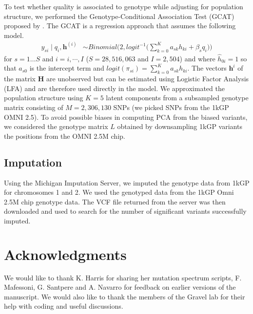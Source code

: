 \documentclass[9pt,article]{template}
\begin{document}
To test whether quality is associated to genotype while adjusting for population structure, we performed the Genotype-Conditional Association Test  (GCAT) proposed by \citep{song2015testing}.
The GCAT is a regression approach that assumes the following model.
\begin{align}\label{gcat}
 y_{si} \mid q_i, \boldsymbol{h}^{(i)} &\sim Binomial\bigg( 2, logit^{-1}\Big( \sum_{k=0}^{K} a_{sk} h_{ki} + \beta_s q_i\Big) \bigg)
\end{align} 
for $s=1\hdots S$ and $i=i,\cdots, I$  ($S = 28,516,063$ and $I = 2,504$) and where $\hat{h}_{0i}=1$ so that $a_{s0}$ is the intercept term and $logit(\pi_{si})=\sum_{k=0}^{K} a_{sk} h_{ki}$. 
The vectors $\boldsymbol{h}^{i}$ of the matrix $\mathbf{H}$ are unobserved but can be estimated using Logistic Factor Analysis (LFA) \citep{song2015testing} and are therefore used directly in the model. 
We approximated the population structure using $K=5$ latent components from a subsampled genotype matrix consisting of $M = 2,306,130$ SNPs (we picked SNPs from the 1kGP OMNI 2.5). 
To avoid possible biases in computing PCA from the biased variants, we considered the genotype matrix $L$ obtained by downsampling 1kGP variants the positions from the OMNI 2.5M chip.

\subsection{Imputation}
Using the Michigan Imputation Server, we imputed the genotype data from 1kGP for chromosomes 1 and 2.
We used the genotyped data from the 1kGP Omni 2.5M chip genotype data.
The VCF file returned from the server was then downloaded and used to search for the number of significant variants successfully imputed. 

\section{Acknowledgments}
We would like to thank K. Harris for sharing her mutation spectrum scripts, F. Mafessoni, G. Santpere and A. Navarro for feedback on earlier versions of the manuscript.
We would also like to thank the members of the Gravel lab for their help with coding and useful discussions.
\end{document}
